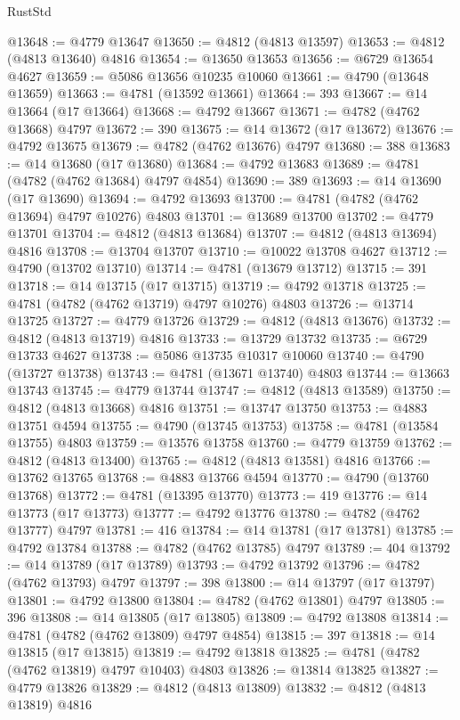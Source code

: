 \begin{lexlean}{RustStd}
\begin{coremodule}
@13648 := @4779 @13647
@13650 := @4812 (@4813 @13597)
@13653 := @4812 (@4813 @13640) @4816
@13654 := @13650 @13653
@13656 := @6729 @13654 @4627
@13659 := @5086 @13656 @10235 @10060
@13661 := @4790 (@13648 @13659)
@13663 := @4781 (@13592 @13661)
@13664 := 393
@13667 := @14 @13664 (@17 @13664)
@13668 := @4792 @13667
@13671 := @4782 (@4762 @13668) @4797
@13672 := 390
@13675 := @14 @13672 (@17 @13672)
@13676 := @4792 @13675
@13679 := @4782 (@4762 @13676) @4797
@13680 := 388
@13683 := @14 @13680 (@17 @13680)
@13684 := @4792 @13683
@13689 := @4781 (@4782 (@4762 @13684) @4797 @4854)
@13690 := 389
@13693 := @14 @13690 (@17 @13690)
@13694 := @4792 @13693
@13700 := @4781 (@4782 (@4762 @13694) @4797 @10276) @4803
@13701 := @13689 @13700
@13702 := @4779 @13701
@13704 := @4812 (@4813 @13684)
@13707 := @4812 (@4813 @13694) @4816
@13708 := @13704 @13707
@13710 := @10022 @13708 @4627
@13712 := @4790 (@13702 @13710)
@13714 := @4781 (@13679 @13712)
@13715 := 391
@13718 := @14 @13715 (@17 @13715)
@13719 := @4792 @13718
@13725 := @4781 (@4782 (@4762 @13719) @4797 @10276) @4803
@13726 := @13714 @13725
@13727 := @4779 @13726
@13729 := @4812 (@4813 @13676)
@13732 := @4812 (@4813 @13719) @4816
@13733 := @13729 @13732
@13735 := @6729 @13733 @4627
@13738 := @5086 @13735 @10317 @10060
@13740 := @4790 (@13727 @13738)
@13743 := @4781 (@13671 @13740) @4803
@13744 := @13663 @13743
@13745 := @4779 @13744
@13747 := @4812 (@4813 @13589)
@13750 := @4812 (@4813 @13668) @4816
@13751 := @13747 @13750
@13753 := @4883 @13751 @4594
@13755 := @4790 (@13745 @13753)
@13758 := @4781 (@13584 @13755) @4803
@13759 := @13576 @13758
@13760 := @4779 @13759
@13762 := @4812 (@4813 @13400)
@13765 := @4812 (@4813 @13581) @4816
@13766 := @13762 @13765
@13768 := @4883 @13766 @4594
@13770 := @4790 (@13760 @13768)
@13772 := @4781 (@13395 @13770)
@13773 := 419
@13776 := @14 @13773 (@17 @13773)
@13777 := @4792 @13776
@13780 := @4782 (@4762 @13777) @4797
@13781 := 416
@13784 := @14 @13781 (@17 @13781)
@13785 := @4792 @13784
@13788 := @4782 (@4762 @13785) @4797
@13789 := 404
@13792 := @14 @13789 (@17 @13789)
@13793 := @4792 @13792
@13796 := @4782 (@4762 @13793) @4797
@13797 := 398
@13800 := @14 @13797 (@17 @13797)
@13801 := @4792 @13800
@13804 := @4782 (@4762 @13801) @4797
@13805 := 396
@13808 := @14 @13805 (@17 @13805)
@13809 := @4792 @13808
@13814 := @4781 (@4782 (@4762 @13809) @4797 @4854)
@13815 := 397
@13818 := @14 @13815 (@17 @13815)
@13819 := @4792 @13818
@13825 := @4781 (@4782 (@4762 @13819) @4797 @10403) @4803
@13826 := @13814 @13825
@13827 := @4779 @13826
@13829 := @4812 (@4813 @13809)
@13832 := @4812 (@4813 @13819) @4816

\end{coremodule}
\end{lexlean}
